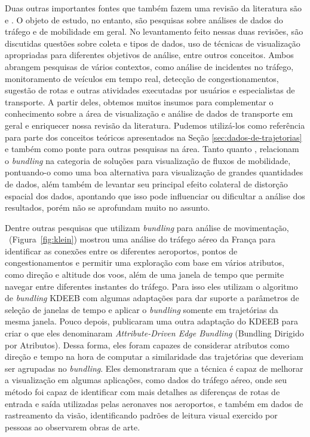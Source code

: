 Duas outras importantes fontes que também fazem uma revisão da literatura são
\citet{Chen2015} e \citet{Andrienko2017Visual}. O objeto de estudo, no entanto,
são pesquisas sobre análises de dados do tráfego e de mobilidade em geral. No
levantamento feito nessas duas revisões, são discutidas questões sobre coleta e
tipos de dados, uso de técnicas de visualização apropriadas para diferentes
objetivos de análise, entre outros conceitos. Ambos abrangem 
pesquisas de vários contextos, como análise de incidentes no tráfego,
monitoramento de veículos em tempo real, detecção de congestionamentos, sugestão
de rotas e outras atividades executadas por usuários e especialistas de
transporte. A partir deles, obtemos muitos insumos para
complementar o conhecimento sobre a área de visualização e análise de dados de
transporte em geral e enriquecer nossa revisão da literatura. Pudemos
utilizá-los como referência para parte dos conceitos teóricos apresentados na
Seção \ref{sec:dados-de-trajetorias} e também como ponte para outras pesquisas
na área. Tanto \citet{Chen2015} quanto \citet{Andrienko2017Visual}, relacionam o
\emph{bundling} na categoria de soluções para visualização de fluxos de
mobilidade, pontuando-o como uma boa alternativa para visualização de grandes
quantidades de dados, além também de levantar seu principal efeito colateral de
distorção espacial dos dados, apontando que isso pode influenciar ou dificultar
a análise dos resultados, porém não se aprofundam muito no assunto.

Dentre outras pesquisas que utilizam \emph{bundling} para análise de
movimentação, \citet{Klein2014}~(Figura~\ref{fig:klein}) mostrou uma análise do
tráfego aéreo da França para identificar as conexões entre os diferentes
aeroportos, pontos de congestionamentos e permitir uma exploração com base em
vários atributos, como direção e altitude dos voos, além de uma janela de tempo
que permite navegar entre diferentes instantes do tráfego. Para isso eles
utilizam o algoritmo de \emph{bundling} KDEEB com algumas adaptações para dar
suporte a parâmetros de seleção de janelas de tempo e aplicar o \emph{bundling}
somente em trajetórias da mesma janela. Pouco depois, \citet{adeb} publicaram
uma outra adaptação do KDEEB para criar o que eles denominaram
\emph{Attribute-Driven Edge Bundling} (Bundling Dirigido por Atributos). Dessa
forma, eles foram capazes de considerar atributos como direção e tempo na hora
de computar a similaridade das trajetórias que deveriam ser agrupadas no
\emph{bundling}. Eles demonstraram que a técnica é capaz de melhorar a
visualização em algumas aplicações, como dados do tráfego aéreo, onde seu método
foi capaz de identificar com mais detalhes as diferenças de rotas de entrada e
saída utilizadas pelas aeronaves nos aeroportos, e também em dados de
rastreamento da visão, identificando padrões de leitura visual exercido
por pessoas ao observarem obras de arte.


